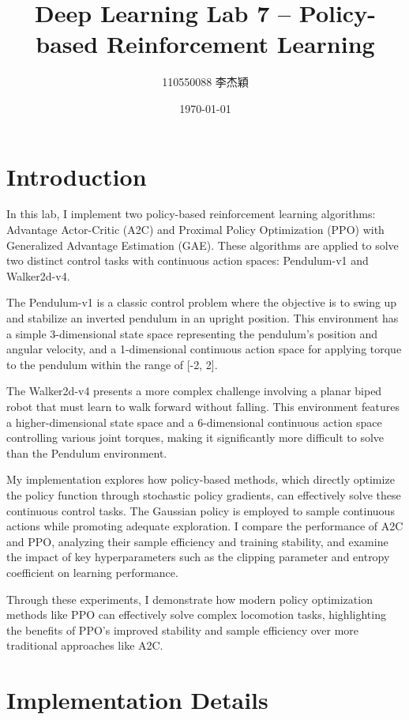 \documentclass[a4paper,twocolumn]{article}
\title{Deep Learning Lab 7 -- Policy-based Reinforcement Learning}
\author{110550088 李杰穎}
\date{\today}
\begin{document}
\maketitle
\section{Introduction}

In this lab, I implement two policy-based reinforcement learning algorithms: Advantage Actor-Critic (A2C)\cite{mnih2016asynchronous} and Proximal Policy Optimization (PPO)\cite{schulman2017proximal} with Generalized Advantage Estimation (GAE). These algorithms are applied to solve two distinct control tasks with continuous action spaces: Pendulum-v1 and Walker2d-v4.

The Pendulum-v1 is a classic control problem where the objective is to swing up and stabilize an inverted pendulum in an upright position. This environment has a simple 3-dimensional state space representing the pendulum's position and angular velocity, and a 1-dimensional continuous action space for applying torque to the pendulum within the range of [-2, 2].

The Walker2d-v4 presents a more complex challenge involving a planar biped robot that must learn to walk forward without falling. This environment features a higher-dimensional state space and a 6-dimensional continuous action space controlling various joint torques, making it significantly more difficult to solve than the Pendulum environment.

My implementation explores how policy-based methods, which directly optimize the policy function through stochastic policy gradients, can effectively solve these continuous control tasks. The Gaussian policy is employed to sample continuous actions while promoting adequate exploration. I compare the performance of A2C and PPO, analyzing their sample efficiency and training stability, and examine the impact of key hyperparameters such as the clipping parameter and entropy coefficient on learning performance.

Through these experiments, I demonstrate how modern policy optimization methods like PPO can effectively solve complex locomotion tasks, highlighting the benefits of PPO's improved stability and sample efficiency over more traditional approaches like A2C.

\section{Implementation Details}
\end{document}
